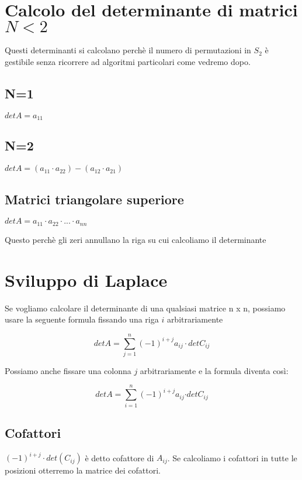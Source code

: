\documentclass[a4paper, 10pt]{article}
\begin{document}
\section{Calcolo del determinante di matrici $N<2$}

Questi determinanti si calcolano perchè il numero di permutazioni in $S_2$ è gestibile senza ricorrere ad algoritmi particolari come vedremo dopo.

\subsection{N=1}

$ detA = a_{11} $

\subsection{N=2}

$ detA = (a_{11} \cdot a_{22}) - (a_{12} \cdot a_{21}) $

\subsection{Matrici triangolare superiore}
$ detA = a_{11} \cdot a_{22} \cdot ... \cdot a_{nn} $

Questo perchè gli zeri annullano la riga su cui calcoliamo il determinante

\section{Sviluppo di Laplace}

Se vogliamo calcolare il determinante di una qualsiasi matrice n x n, possiamo usare la seguente formula fissando una riga $i$ arbitrariamente

$$detA=\sum_{j=1}^{n}{\left(-1\right)^{i+j}}a_{ij}\cdot detC_{ij}$$

Possiamo anche fissare una colonna $j$ arbitrariamente e la formula diventa così:

$$detA=\sum_{i=1}^{n}{\left(-1\right)^{i+j}}a_{ij}{\cdot detC}_{ij}$$

\subsection{Cofattori}

$ {\left(-1\right)^{i+j}} \cdot det(C_{ij}) $ è detto cofattore di $A_{ij}$. Se calcoliamo i cofattori in tutte le posizioni otterremo la matrice dei cofattori.
\end{document}
